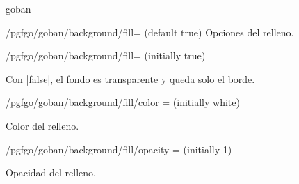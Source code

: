 \begin{environment}{{goban}}
	\begin{key}{/pgfgo/goban/background/fill= (default true)}
		Opciones del relleno.
	\end{key}
	
	\begin{key}{/pgfgo/goban/background/fill= (initially true)}
		
		Con |false|, el fondo es transparente y queda solo el borde.
		
		\begin{codeexample}[]
			
			\begin{goban}[background = {line = {color = red}}, name = a]
			\end{goban}
			
			\begin{goban}[background = {line = false}, resume = a]
			\end{goban}
		\end{codeexample}
	\end{key}
	
	\begin{key}{/pgfgo/goban/background/fill/color = (initially white)}
		
		Color del relleno.
		
		\begin{codeexample}[]
			
			\begin{goban}[background = {fill = {color = orange!40}}, name = a]
			\end{goban}
			
			\begin{goban}[background = {fill = {color = olive!30}}, resume = a]
			\end{goban}
		\end{codeexample}
	\end{key}
	
	\begin{key}{/pgfgo/goban/background/fill/opacity = (initially 1)}
		
		Opacidad del relleno.
		
		\begin{codeexample}[]
			
			\begin{goban}[background = {fill = {color = orange!40}}, name = a]
			\end{goban}
			

\end{codeexample}
\end{key}
\end{environment}
